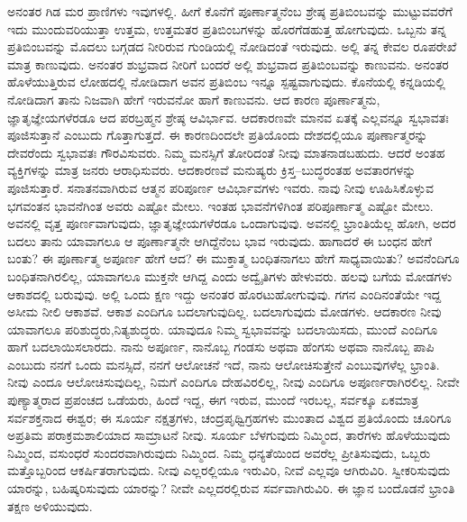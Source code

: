 ಅನಂತರ ಗಿಡ ಮರ ಪ್ರಾಣಿಗಳು ಇವುಗಳಲ್ಲಿ. ಹೀಗೆ ಕೊನೆಗೆ ಪೂರ್ಣಾತ್ಮನೆಂಬ ಶ್ರೇಷ್ಠ ಪ್ರತಿಬಿಂಬವನ್ನು ಮುಟ್ಟುವವರೆಗೆ ಇದು ಮುಂದುವರಿಯುತ್ತಾ ಉತ್ತಮ, ಉತ್ತಮತರ ಪ್ರತಿಬಿಂಬಗಳನ್ನು ಹೊರಗೆಡಹುತ್ತ ಹೋಗುವುದು. ಒಬ್ಬನು ತನ್ನ ಪ್ರತಿಬಿಂಬವನ್ನು ಮೊದಲು ಬಗ್ಗಡದ ನೀರಿರುವ ಗುಂಡಿಯಲ್ಲಿ ನೋಡಿದಂತೆ ಇರುವುದು. ಅಲ್ಲಿ ತನ್ನ ಕೇವಲ ರೂಪರೇಖೆ ಮಾತ್ರ ಕಾಣುವುದು. ಅನಂತರ ಶುಭ್ರವಾದ ನೀರಿಗೆ ಬಂದರೆ ಅಲ್ಲಿ ಶುಭ್ರವಾದ ಪ್ರತಿಬಿಂಬವನ್ನು ಕಾಣುವನು. ಅನಂತರ ಹೊಳೆಯುತ್ತಿರುವ ಲೋಹದಲ್ಲಿ ನೋಡಿದಾಗ ಅವನ ಪ್ರತಿಬಿಂಬ ಇನ್ನೂ ಸ್ಪಷ್ಟವಾಗುವುದು. ಕೊನೆಯಲ್ಲಿ ಕನ್ನಡಿಯಲ್ಲಿ ನೋಡಿದಾಗ ತಾನು ನಿಜವಾಗಿ ಹೇಗೆ ಇರುವನೋ ಹಾಗೆ ಕಾಣುವನು. ಆದ ಕಾರಣ ಪೂರ್ಣಾತ್ಮನು, ಜ್ಞಾತೃಜ್ಞೇಯಗಳೆರಡೂ ಆದ ಪರಬ್ರಹ್ಮನ ಶ್ರೇಷ್ಠ ಆವಿರ್ಭಾವ. ಆದಕಾರಣವೇ ಮಾನವ ಏತಕ್ಕೆ ಎಲ್ಲವನ್ನೂ ಸ್ವಭಾವತಃ ಪೂಜಿಸುತ್ತಾನೆ ಎಂಬುದು ಗೊತ್ತಾಗುತ್ತದೆ. ಈ ಕಾರಣದಿಂದಲೇ ಪ್ರತಿಯೊಂದು ದೇಶದಲ್ಲಿಯೂ ಪೂರ್ಣಾತ್ಮರನ್ನು ದೇವರೆಂದು ಸ್ವಭಾವತಃ ಗೌರವಿಸುವರು. ನಿಮ್ಮ ಮನಸ್ಸಿಗೆ ತೋರಿದಂತೆ ನೀವು ಮಾತನಾಡಬಹುದು. ಆದರೆ ಅಂತಹ ವ್ಯಕ್ತಿಗಳನ್ನು ಮಾತ್ರ ಜನರು ಆರಾಧಿಸುವರು. ಆದಕಾರಣವೆ ಮನುಷ್ಯರು ಕ್ರಿಸ್ತ–ಬುದ್ಧರಂತಹ ಅವತಾರಗಳನ್ನು ಪೂಜಿಸುತ್ತಾರೆ. ಸನಾತನವಾಗಿರುವ ಆತ್ಮನ ಪರಿಪೂರ್ಣ ಆವಿರ್ಭಾವಗಳು ಇವರು. ನಾವು ನೀವು ಊಹಿಸಿಕೊಳ್ಳುವ ಭಗವಂತನ ಭಾವನೆಗಿಂತ ಅವರು ಎಷ್ಟೋ ಮೇಲು. ಇಂತಹ ಭಾವನೆಗಳಿಗಿಂತ ಪರಿಪೂರ್ಣಾತ್ಮ ಎಷ್ಟೋ ಮೇಲು. ಅವನಲ್ಲಿ ವೃತ್ತ ಪೂರ್ಣವಾಗುವುದು, ಜ್ಞಾತೃಜ್ಞೇಯಗಳೆರಡೂ ಒಂದಾಗುವುವು. ಅವನಲ್ಲಿ ಭ್ರಾಂತಿಯೆಲ್ಲ ಹೋಗಿ, ಅದರ ಬದಲು ತಾನು ಯಾವಾಗಲೂ ಆ ಪೂರ್ಣಾತ್ಮನೇ ಆಗಿದ್ದೆನೆಂಬ ಭಾವ ಇರುವುದು. ಹಾಗಾದರೆ ಈ ಬಂಧನ ಹೇಗೆ ಬಂತು? ಈ ಪೂರ್ಣಾತ್ಮ ಅಪೂರ್ಣ ಹೇಗೆ ಆದ? ಈ ಮುಕ್ತಾತ್ಮ ಬಂಧಿತನಾಗಲು ಹೇಗೆ ಸಾಧ್ಯವಾಯಿತು? ಅವನೆಂದಿಗೂ ಬಂಧಿತನಾಗಿರಲಿಲ್ಲ, ಯಾವಾಗಲೂ ಮುಕ್ತನೇ ಆಗಿದ್ದ ಎಂದು ಅದ್ವೈತಿಗಳು ಹೇಳುವರು. ಹಲವು ಬಗೆಯ ಮೋಡಗಳು ಆಕಾಶದಲ್ಲಿ ಬರುವುವು. ಅಲ್ಲಿ ಒಂದು ಕ್ಷಣ ಇದ್ದು ಅನಂತರ ಹೊರಟುಹೋಗುವುವು. ಗಗನ ಎಂದಿನಂತೆಯೇ ಇದ್ದ ಅಸೀಮ ನೀಲಿ ಆಕಾಶವೆ. ಆಕಾಶ ಎಂದಿಗೂ ಬದಲಾಗುವುದಿಲ್ಲ. ಬದಲಾಗುವುದು ಮೋಡಗಳು. ಆದಕಾರಣ ನೀವು ಯಾವಾಗಲೂ ಪರಿಶುದ್ಧರು,\break ನಿತ್ಯಶುದ್ಧರು. ಯಾವುದೂ ನಿಮ್ಮ ಸ್ವಭಾವವನ್ನು ಬದಲಾಯಿಸದು, ಮುಂದೆ ಎಂದಿಗೂ ಹಾಗೆ ಬದಲಾಯಿಸಲಾರದು. ನಾನು ಅಪೂರ್ಣ, ನಾನೊಬ್ಬ ಗಂಡಸು ಅಥವಾ ಹೆಂಗಸು ಅಥವಾ ನಾನೊಬ್ಬ ಪಾಪಿ ಎಂಬುದು ನನಗೆ ಒಂದು ಮನಸ್ಸಿದೆ, ನನಗೆ ಆಲೋಚನೆ ಇದೆ, ನಾನು ಆಲೋಚಿಸುತ್ತೇನೆ ಎಂಬುವುಗಳೆಲ್ಲ ಭ್ರಾಂತಿ. ನೀವು ಎಂದೂ ಆಲೋಚಿಸುವುದಿಲ್ಲ, ನಿಮಗೆ ಎಂದಿಗೂ ದೇಹವಿರಲಿಲ್ಲ, ನೀವು ಎಂದಿಗೂ ಅಪೂರ್ಣರಾಗಿರಲಿಲ್ಲ. ನೀವೇ ಪುಣ್ಯಾತ್ಮರಾದ ಪ್ರಪಂಚದ ಒಡೆಯರು, ಹಿಂದೆ ಇದ್ದ, ಈಗ ಇರುವ, ಮುಂದೆ ಇರಬಲ್ಲ, ಸರ್ವಕ್ಕೂ ಏಕಮಾತ್ರ ಸರ್ವಶಕ್ತನಾದ ಈಶ್ವರ; ಈ ಸೂರ್ಯ ನಕ್ಷತ್ರಗಳು, ಚಂದ್ರಪೃಥ್ವಿಗ್ರಹಗಳು ಮುಂತಾದ ವಿಶ್ವದ ಪ್ರತಿಯೊಂದು ಚೂರಿಗೂ ಅಪ್ರತಿಮ ಪರಾಕ್ರಮಶಾಲಿಯಾದ ಸಾಮ್ರಾಟನೆ ನೀವು. ಸೂರ್ಯ ಬೆಳಗುವುದು ನಿಮ್ಮಿಂದ, ತಾರೆಗಳು ಹೊಳೆಯುವುದು ನಿಮ್ಮಿಂದ, ವಸುಂಧರೆ ಸುಂದರವಾಗಿರುವುದು ನಿಮ್ಮಿಂದ. ನಿಮ್ಮ ಧನ್ಯತೆಯಿಂದ ಅವರೆಲ್ಲ ಪ್ರೀತಿಸುವುದು, ಒಬ್ಬರು ಮತ್ತೊಬ್ಬರಿಂದ ಆಕರ್ಷಿತರಾಗುವುದು. ನೀವು ಎಲ್ಲರಲ್ಲಿಯೂ ಇರುವಿರಿ, ನೀವೆ ಎಲ್ಲವೂ ಆಗಿರುವಿರಿ. ಸ್ವೀಕರಿಸುವುದು ಯಾರನ್ನು, ಬಹಿಷ್ಕರಿಸುವುದು ಯಾರನ್ನು? ನೀವೇ ಎಲ್ಲದರಲ್ಲಿರುವ ಸರ್ವವಾಗಿರುವಿರಿ. ಈ ಜ್ಞಾನ ಬಂದೊಡನೆ ಭ್ರಾಂತಿ ತಕ್ಷಣ ಅಳಿಯುವುದು.

